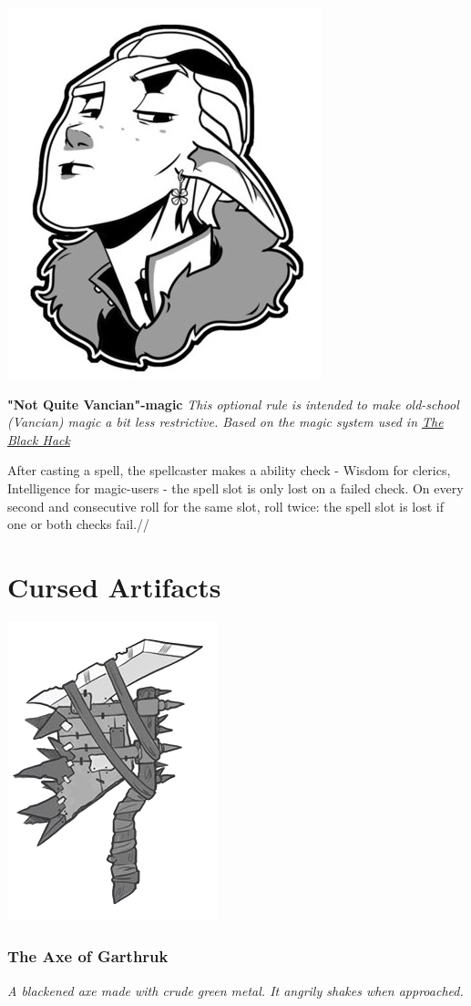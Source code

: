 \documentclass[letterpaper,sansserif,tightsqueeze]{rpg-module}
\begin{document}
\begin{center}
	\includegraphics[width = 0.3\linewidth]{shame_elf.jpg}
\end{center}
\textbf{"Not Quite Vancian"-magic}
\textit{This optional rule is intended to make old-school (Vancian) magic a bit less restrictive. Based on the magic system used in \href{https://www.drivethrurpg.com/product/255088/The-Black-Hack-Second-Edition}{The Black Hack}}

After casting a spell, the spellcaster makes a ability check - Wisdom for clerics, Intelligence for magic-users - the spell slot is only lost on a failed check. On every second and consecutive roll for the same slot, roll twice: the spell slot is lost if one or both checks fail.//

\vspace{0.5cm}
\part*{Cursed Artifacts}
\vspace{0.5cm}

\begin{center}
	\includegraphics[width = 0.3\linewidth]{Garthruks_axe.png}
\end{center}
\section{The Axe of Garthruk}
\textit{A blackened axe made with crude green metal. It angrily shakes when approached.}
\end{document}
